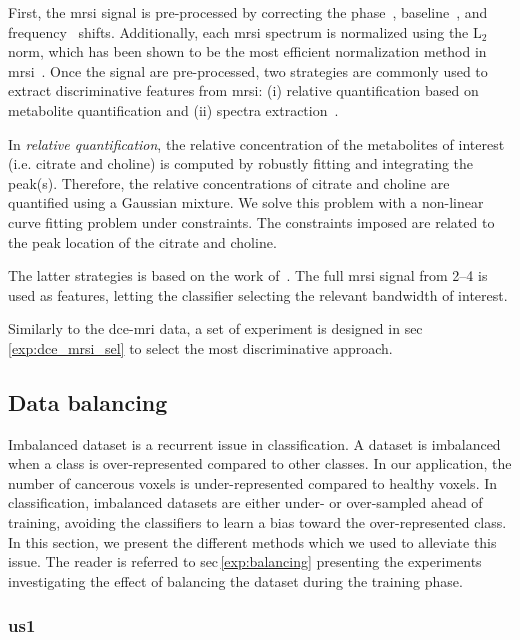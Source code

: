 \documentclass[final,3p,times,twocolumn]{elsarticle}
\begin{document}
First, the \ac{mrsi} signal is pre-processed by correcting the
phase~\cite{Chen2002}, baseline~\cite{xi2008baseline}, and
frequency~\cite{Parfait2012} shifts. Additionally, each \ac{mrsi} spectrum is
normalized using the L$_2$ norm, which has been shown to be the most efficient
normalization method in \ac{mrsi}~\cite{Parfait2012}.  Once the signal are
pre-processed, two strategies are commonly used to extract discriminative
features from \ac{mrsi}: (i) relative quantification based on metabolite
quantification and (ii) spectra extraction~\cite{Parfait2012}.

In \emph{relative quantification}, the relative concentration of the
metabolites of interest (i.e. citrate and choline) is computed by robustly
fitting and integrating the peak(s). Therefore, the relative
concentrations of citrate and choline are quantified using a Gaussian
mixture. We solve this problem with a non-linear curve fitting problem under
constraints. The constraints imposed are related to the peak location of the
citrate and choline.

The latter strategies is based on the work of~\cite{Parfait2012}. The full
\ac{mrsi} signal from \SIrange{2}{4}{\ppm} is used as features, letting the
classifier selecting the relevant \si{\ppm} bandwidth of interest.

Similarly to the \ac{dce}-\ac{mri} data, a set of experiment is designed in
\acs{sec}\,\ref{exp:dce_mrsi_sel} to select the most discriminative approach.

\subsection{Data balancing}\label{features:balancing}

Imbalanced dataset is a recurrent issue in classification. A dataset is
imbalanced when a class is over-represented compared to other classes. In our
application, the number of cancerous voxels is under-represented compared to
healthy voxels. In classification, imbalanced datasets are either under- or
over-sampled ahead of training, avoiding the classifiers to learn a bias toward
the over-represented class. In this section, we present the different methods
which we used to alleviate this issue. The reader is referred to
\acs{sec}\,\ref{exp:balancing} presenting the experiments investigating the
effect of balancing the dataset during the training phase.

\subsubsection{\Acl*{us1}}
\end{document}
